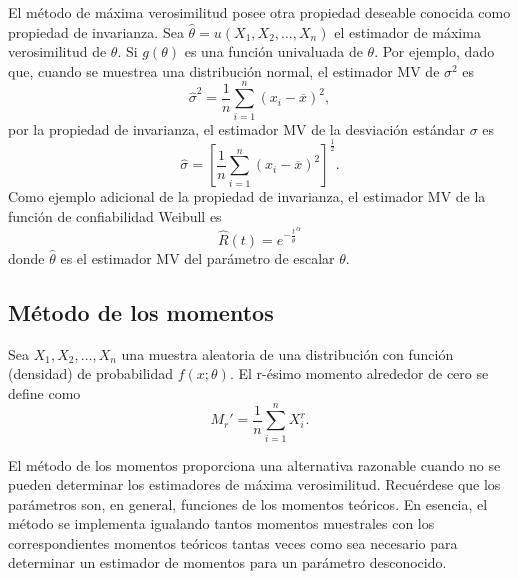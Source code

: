 El método de máxima verosimilitud posee otra propiedad deseable conocida como propiedad de invarianza. Sea $\hat{\theta}=u(X_1,X_2,\ldots,X_n)$ el estimador de máxima verosimilitud de $\theta$. Si $g(\theta)$ es una función univaluada de $\theta$. Por ejemplo, dado que, cuando se muestrea una distribución normal, el estimador MV de $\sigma^2$ es
$$\hat{\sigma}^2 = \dfrac{1}{n}\sum_{i=1}^n \left(x_i-\overline{x}\right)^2,$$
por la propiedad de invarianza, el estimador MV de la desviación estándar $\sigma$ es
$$\hat{\sigma}=\left[\dfrac{1}{n}\sum_{i=1}^n (x_i-\overline{x})^2\right]^{\frac{1}{2}}.$$
Como ejemplo adicional de la propiedad de invarianza, el estimador MV de la función de confiabilidad Weibull es
$$\hat{R}(t)=e^{-\frac{t}{\hat{\theta}}^\alpha}$$
donde $\hat{\theta}$ es el estimador MV del parámetro de escalar $\theta$.


\subsection{Método de los momentos}

\begin{def.}
    Sea $X_1,X_2,\ldots,X_n$ una muestra aleatoria de una distribución con función (densidad) de probabilidad $f(x;\theta)$. El r-ésimo momento alrededor de cero se define como
    $$M_r'=\dfrac{1}{n}\sum_{i=1}^n X_i^r.$$
\end{def.}

El método de los momentos proporciona una alternativa razonable cuando no se pueden determinar los estimadores de máxima verosimilitud. Recuérdese que los parámetros son, en general, funciones de los momentos teóricos. En esencia, el método se implementa igualando tantos momentos muestrales con los correspondientes momentos teóricos tantas veces como sea necesario para determinar un estimador de momentos para un parámetro desconocido.

